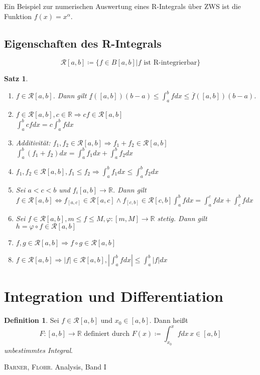 \documentclass[ngerman,titlepage,twoside, parskip=half*]{scrreprt}
\newcommand*{\R}{\mathbb{R}}
\newcommand*{\RR}{\mathcal{R}}
\theoremstyle{plain}
\newtheorem{theorem}{Satz}[section]
\theoremstyle{definition}
\newtheorem{definition}{Definition}
\theoremstyle{remark}
\begin{document}
Ein Beispiel zur numerischen Auswertung eines R-Integrals über ZWS ist die
Funktion $f(x)=x^\alpha$.

\subsection{Eigenschaften des R-Integrals}
\[\RR[a,b]\coloneqq\{f\in B[a,b] | f \text{ ist R-integrierbar}\}\]

\begin{theorem}
  \begin{enumerate}
    \item $f\in\RR[a,b]$. Dann gilt $\underline{f}([a,b])(b-a)\leq\int_a^b
      fdx\leq \overline{f}([a,b])(b-a)$.
    \item $f\in\RR[a,b], c\in\R\Rightarrow cf\in\RR[a,b]$\\
      $\int_a^b cfdx=c\int_a^b fdx$
    \item Additivität: $f_1,f_2\in\RR[a,b]\Rightarrow f_1+f_2\in\RR[a,b]$\\
      $\int_a^b (f_1+f_2)dx=\int_a^b f_1dx + \int_a^b f_2dx$
    \item $f_1,f_2\in\RR[a,b], f_1\leq f_2\Rightarrow \int_a^b f_1dx\leq 
      \int_a^b f_2dx$
    \item Sei $a<c<b$ und $f_i[a,b]\rightarrow\R$. Dann gilt $f\in\RR[a,b]
      \Leftrightarrow f_{[a,c]}\in\RR[a,c]\wedge f_{[c,b]}\in\RR[c,b]
      \int_a^b fdx=\int_a^c fdx + \int_c^b fdx$
    \item Sei $f\in\RR[a,b], m\leq f\leq M, \varphi\colon[m,M]\rightarrow\R$ stetig.
      Dann gilt $h=\varphi\circ f\in\RR[a,b]$
    \item $f,g\in\RR[a,b]\Rightarrow f\circ g \in\RR[a,b]$
    \item $f\in\RR[a,b]\Rightarrow |f|\in\RR[a,b], |\int_a^b fdx|\leq\int_a^b
      |f|dx$
  \end{enumerate}
\end{theorem}

\section{Integration und Differentiation}

\begin{definition}
  Sei $f\in\RR[a,b]$ und $x_0\in[a,b]$. Dann heißt
  \[F\colon[a,b]\rightarrow\R\text{ definiert durch }
  F(x)\coloneqq\int_{x_0}^x fdx\,x\in[a,b]\]
  \emph{unbestimmtes Integral}.
\end{definition}

\clearpage
\begin{thebibliography}{99}

  \textsc{Barner}, \textsc{Flohr}. Analysis, Band I
\end{thebibliography}

\printindex
\end{document}
